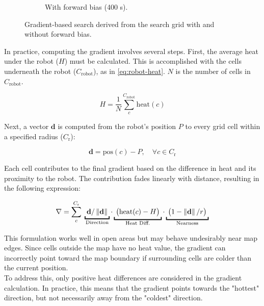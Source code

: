 \begin{figure}[H]
\begin{subfigure}[b]{0.45\textwidth}
    \caption{With forward bias (400 s).}
    \label{fig:search-gradient-forward}
  \end{subfigure}
  \caption{Gradient-based search derived from the search grid with and without forward bias.}
  \label{fig:gradient-forward-bias}
\end{figure}


In practice, computing the gradient involves several steps. First, the average heat under the robot ($H$) must be calculated. This is accomplished with the cells underneath the robot ($C_\mathrm{robot}$), as in \cref{eq:robot-heat}. $N$ is the number of cells in $C_\mathrm{robot}$.

\begin{equation}
\label{eq:robot-heat}
    H = \frac{1}{N} \sum_c^{C_\mathrm{robot}} \mathrm{heat}(c)
\end{equation}

Next, a vector $\mathbf{d}$ is computed from the robot's position $P$ to every grid cell within a specified radius ($C_\mathrm{r}$):

\begin{equation}
    \mathbf{d} = \mathrm{pos}(c) - P, \quad \forall c \in C_\mathrm{r}
\end{equation}

Each cell contributes to the final gradient based on the difference in heat and its proximity to the robot. The contribution fades linearly with distance, resulting in the following expression:

\begin{equation}
    \nabla = \sum_c^{C_\mathrm{r}} \;
    \underbracket{\; \mathbf{d}/\norm{\mathbf{d}}      \;}_\text{\makebox[0pt]{Direction}} \cdot
    \underbracket{\; \big(\mathrm{heat}(c) - H\big)    \;}_\text{Heat Diff.} \cdot
    \underbracket{\; \big(1 - \norm{\mathbf{d}}/r\big) \;}_\text{Nearness}
    \label{eq:fade-gradient}
\end{equation}

This formulation works well in open areas but may behave undesirably near map edges. Since cells outside the map have no heat value, the gradient can incorrectly point toward the map boundary if surrounding cells are colder than the current position.  \\

To address this, only positive heat differences are considered in the gradient calculation. In practice, this means that the gradient points towards the "hottest" direction, but not necessarily away from the "coldest" direction.

